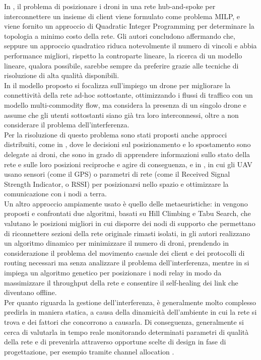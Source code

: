 In \cite{6564778}, il problema di posizionare i droni in una rete hub-and-spoke per interconnettere un insieme di client viene formulato come problema MILP, e viene fornito un approccio di Quadratic Integer Programming per determinare la topologia a minimo costo della rete.
Gli autori concludono affermando che, seppure un approccio quadratico riduca notevolmente il numero di vincoli e abbia performance migliori, rispetto la controparte lineare, la ricerca di un modello lineare, qualora possibile, sarebbe sempre da preferire grazie alle tecniche di risoluzione di alta qualità disponibili.\\
In \cite{4455114} il modello proposto si focalizza sull'impiego un drone per migliorare la connettività della rete ad-hoc sottostante, ottimizzando i flussi di traffico con un modello multi-commodity flow, ma considera la presenza di un singolo drone e assume che gli utenti sottostanti siano già tra loro interconnessi, oltre a non considerare il problema dell'interferenza. \\
Per la risoluzione di questo problema sono stati proposti anche approcci distribuiti, come in \cite{Correll09ad-hocwireless}, dove le decisioni sul posizionamento e lo spostamento sono delegate ai droni, che sono in grado di apprendere informazioni sullo stato della rete e sulle loro posizioni reciproche e agire di conseguenza, e in \cite{6162393}, in cui gli UAV usano sensori (come il GPS) o parametri di rete (come il Received Signal Strength Indicator, o RSSI) per posizionarsi nello spazio e ottimizzare la comunicazione con i nodi a terra. \\
Un altro approccio ampiamente usato è quello delle metaeuristiche: in \cite{5983050} vengono proposti e confrontati due algoritmi, basati su Hill Climbing e Tabu Search, che valutano le posizioni migliori in cui disporre dei nodi di supporto che permettano di riconnettere sezioni della rete originale rimasti isolati, in \cite{1495151} gli autori realizzano un algoritmo dinamico per minimizzare il numero di droni, prendendo in considerazione il problema del movimento casuale dei client e dei protocolli di routing necessari ma senza analizzare il problema dell'interferenza, mentre in \cite{Rohde20131893} si impiega un algoritmo genetico per posizionare i nodi relay in modo da massimizzare il throughput della rete e consentire il self-healing dei link che diventano offline. \\     
Per quanto riguarda la gestione dell'interferenza, è generalmente molto complesso predirla in maniera statica, a causa della dinamicità dell'ambiente in cui la rete si trova e dei fattori che concorrono a causarla. Di  conseguenza, generalmente si cerca di valutarla in tempo reale monitorando determinati parametri di qualità della rete \cite{Halperin:2010:PPD:1851275.1851203,6151307} e di prevenirla attraverso opportune scelte di design in fase di progettazione, per esempio tramite channel allocation \cite{7383864}. \\

